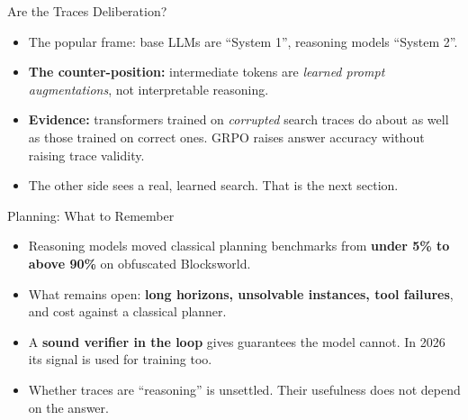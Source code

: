 \begin{frame}{Are the Traces Deliberation?}
    \begin{itemize}\itemsep0.6em
        \item The popular frame: base LLMs are ``System 1'', reasoning models ``System 2''.
        \item \textbf{The counter-position:} intermediate tokens are \emph{learned prompt augmentations}, not interpretable reasoning.
        \item \textbf{Evidence:} transformers trained on \emph{corrupted} search traces do about as well as those trained on correct ones. GRPO raises answer accuracy without raising trace validity.
        \item The other side sees a real, learned search. That is the next section.
    \end{itemize}
    \vspace{0.4em}
\end{frame}

\begin{frame}{Planning: What to Remember}
    \begin{itemize}\itemsep0.6em
        \item Reasoning models moved classical planning benchmarks from \textbf{under 5\% to above 90\%} on obfuscated Blocksworld.
        \item What remains open: \textbf{long horizons, unsolvable instances, tool failures}, and cost against a classical planner.
        \item A \textbf{sound verifier in the loop} gives guarantees the model cannot. In 2026 its signal is used for training too.
        \item Whether traces are ``reasoning'' is unsettled. Their usefulness does not depend on the answer.
    \end{itemize}
    \vspace{0.3em}
    \vspace{0.3em}
\end{frame}
